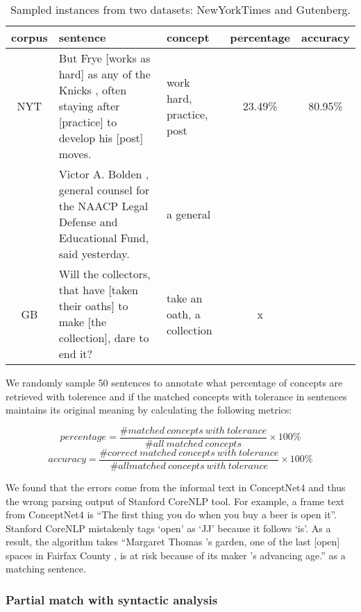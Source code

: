 \begin{table}[th]
	\scriptsize
	\centering
	\begin{tabular}{cP{3cm}P{1.5cm}cc}
		\toprule
		corpus &sentence  & concept & percentage & accuracy \\ \hline 
		NYT & But Frye [works as hard] as any of the Knicks , often staying after [practice] to develop his [post] moves. &  work hard, practice, post & 23.49\% & 80.95\%  \\   \hline
		& Victor A. Bolden , general counsel for the NAACP Legal Defense and Educational Fund, said yesterday. & a general & & \\
		 \midrule
         GB&	Will the collectors, that have [taken their oaths] to make [the collection], dare to end it? &take an oath, a collection &x&\\  
         \bottomrule
	\end{tabular}
	\caption{ Sampled instances from two datasets: NewYorkTimes and Gutenberg. }
	\label{table:tolerentTable}
\end{table}

We randomly sample 50 sentences to annotate what percentage of concepts are retrieved with tolerence and if the matched concepts with tolerance in sentences maintains its original meaning by calculating the following metrics:

\begin{equation} \label{percent}
percentage = \frac{\#matched\ concepts\ with\ tolerance}{\#all\ matched\ concepts} \times 100\%
\end{equation}
\begin{equation} \label{acc}
accuracy = \frac{\#correct\ matched\ concepts\ with\ tolerance}{\#all matched\ concepts\ with\ tolerance} \times 100\%
\end{equation}

We found that the errors come from the informal text in ConceptNet4 and thus the wrong parsing output of Stanford CoreNLP tool. For example, a frame text from ConceptNet4 is ``The first thing you do when you {buy a beer} is {open it}''. Stanford CoreNLP mistakenly tags `open' as `JJ' because it follows `is'. As a result, the algorithm takes ``Margaret Thomas 's garden, one of the last [open] spaces in Fairfax County , is at risk because of its maker 's advancing age.'' as a matching sentence.


\subsubsection{Partial match with syntactic analysis}

